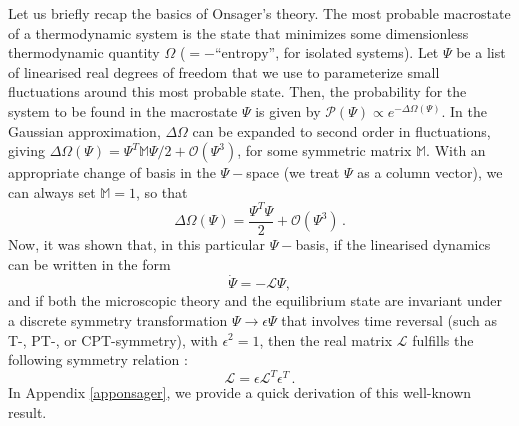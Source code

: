 \documentclass[a4paper, amsfonts, amssymb, amsmath, reprint, showkeys, nofootinbib, twoside,notitlepage,onecolumn]{revtex4-1}
\theoremstyle{definition}
\theoremstyle{theorem}
\begin{document}
Let us briefly recap the basics of Onsager's theory. The most probable macrostate of a thermodynamic system is the state that minimizes some dimensionless thermodynamic quantity $\Omega$ ($=-\text{``entropy''}$, for isolated systems). Let $\Psi$ be a list of linearised real degrees of freedom that we use to parameterize small fluctuations around this most probable state. Then, the probability for the system to be found in the macrostate $\Psi$ is given by $\mathcal{P}(\Psi)\propto e^{-\Delta\Omega(\Psi)}$. In the Gaussian approximation, $\Delta \Omega$ can be expanded to second order in fluctuations, giving $\Delta \Omega(\Psi)=\Psi^T \mathbb{M}\Psi/2+\mathcal{O}(\Psi^3)$, for some symmetric matrix $\mathbb{M}$. With an appropriate change of basis in the $\Psi-$space (we treat $\Psi$ as a column vector), we can always set $\mathbb{M}=1$, so that
\begin{equation}\label{identif}
\Delta\Omega(\Psi)=\dfrac{\Psi^T\Psi}{2}+\mathcal{O}(\Psi^3) \, .
\end{equation}
Now, it was shown \cite{Onsager_1931,Onsager_Casimir} that, in this particular $\Psi-$basis, if the linearised dynamics can be written in the form
\begin{equation}\label{dotpsiLpsi}
\dot{\Psi} = -\mathcal{L}\Psi ,
\end{equation}
and if both the microscopic theory and the equilibrium state are invariant under a discrete symmetry transformation $\Psi \rightarrow \epsilon\Psi$ that involves time reversal (such as T-, PT-, or CPT-symmetry), with $\epsilon^2=1$, then the real matrix $\mathcal{L}$ fulfills the following symmetry relation \cite{Krommes1993}:
\begin{equation}\label{Onsager}
\mathcal{L} = \epsilon \mathcal{L}^T\epsilon^T \,.
\end{equation}
In Appendix \ref{apponsager}, we provide a quick derivation of this well-known result.
\end{document}
